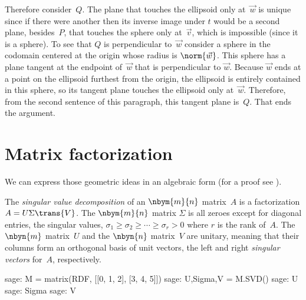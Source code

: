 Therefore consider~$Q$.
The plane that touches the ellipsoid
only at~$\vec{w}$ is unique since if there were another then its inverse image
under $t$
would be a second plane, besides~$P$, 
that touches the sphere only at~$\vec{v}$, which is impossible (since it is a
sphere).
To see that $Q$ is perpendicular to~$\vec{w}$ consider a sphere in the codomain
centered at the origin whose radius is $\norm{\vec{w}}$.
This sphere has a plane tangent at the endpoint of~$\vec{w}$ 
that is perpendicular
to $\vec{w}$.
Because $\vec{w}$ ends at a point on the ellipsoid furthest from the origin,
the ellipsoid is entirely contained in this sphere, so its tangent plane 
touches the ellipsoid only at~$\vec{w}$.
Therefore, from the second sentence of this paragraph, 
this tangent plane is~$Q$. 
That ends the argument.



\section{Matrix factorization}

We can express those geometric ideas in an algebraic form
(for a proof see \cite{TrefethenBau97}).

The \textit{singular value decomposition} of an $\nbym{m}{n}$ matrix~$A$
is a factorization $A=U\Sigma \trans{V}$.
The $\nbym{m}{n}$ matrix $\Sigma$ 
is all zeroes except for diagonal entries, the singular values, 
$\sigma_1\geq \sigma_2 \geq \cdots \geq \sigma_r> 0$ where $r$ is the
rank of~$A$.
The $\nbyn{m}$ matrix~$U$ and the $\nbyn{n}$ matrix~$V$ are unitary, meaning
that their columns form an orthogonal basis of unit vectors, the left and 
right \textit{singular vectors} for~$A$, respectively. 
\begin{sagecommandline}
sage: M = matrix(RDF, [[0, 1, 2], [3, 4, 5]])
sage: U,Sigma,V = M.SVD()
sage: U
sage: Sigma
sage: V  
\end{sagecommandline}

